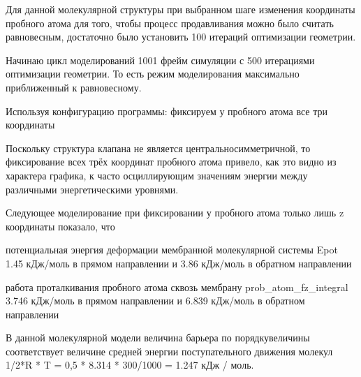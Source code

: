 \documentclass[12pt]{article}
\begin{document}
Для данной молекулярной структуры при выбранном шаге изменения координаты пробного атома для того, чтобы процесс продавливания можно было считать равновесным, достаточно было установить 100 итераций оптимизации геометрии.

Начинаю цикл моделирований 1001 фрейм симуляции с 500 итерациями оптимизации геометрии. То есть режим моделирования максимально приближенный к равновесному.

Используя конфигурацию программы:  фиксируем у пробного атома все три координаты






Поскольку структура клапана не является центральносимметричной, то фиксирование всех трёх координат пробного атома привело, как это видно из характера графика, к часто осциллирующим значениям энергии между различными энергетическими уровнями. 

Следующее моделирование при фиксировании у пробного атома только лишь z координаты показало, что 

потенциальная энергия деформации мембранной молекулярной системы Epot 1.45 кДж/моль в прямом направлении и 3.86 кДж/моль в обратном направлении

работа проталкивания пробного атома сквозь мембрану prob\_atom\_fz\_integral 3.746 кДж/моль в прямом направлении и 6.839 кДж/моль в обратном направлении

В данной молекулярной модели величина барьера по порядкувеличины соответствует величине средней энергии поступательного движения молекул 1/2*R * T = 0,5 * 8.314 * 300/1000 = 1.247 кДж / моль.
\end{document}
